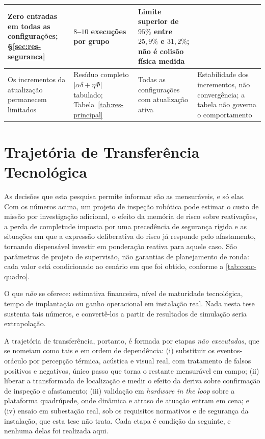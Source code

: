 \begin{table}[htb]
\begin{tabular}{p{}p{}p{}p{}}
Zero entradas em todas as configurações; §\ref{sec:res-seguranca} &
$8$--$10$ execuções por grupo &
Limite superior de $95\%$ entre $25{,}9\%$ e $31{,}2\%$; não é colisão física medida\\
\hline
Os incrementos da atualização permanecem limitados &
Resíduo completo $|\alpha\delta+\eta\Phi|$ tabulado;
Tabela~\ref{tab:res-principal} &
Todas as configurações com atualização ativa &
Estabilidade dos incrementos, não convergência; a tabela não governa o comportamento\\
\hline
\end{tabular}
\end{table}

\section{Trajetória de Transferência Tecnológica}
\label{sec:conc-transferencia}

As decisões que esta pesquisa permite informar são as mensuráveis, e só elas. Com os
números acima, um projeto de inspeção robótica pode estimar o custo de missão por
investigação adicional, o efeito da memória de risco sobre reativações, a perda de
completude imposta por uma precedência de segurança rígida e as situações em que a
expressão deliberativa do risco já responde pelo afastamento, tornando dispensável
investir em ponderação reativa para aquele caso. São parâmetros de projeto de
supervisão, não garantias de planejamento de ronda: cada valor está condicionado ao
cenário em que foi obtido, conforme a \autoref{tab:conc-quadro}.

O que \emph{não} se oferece: estimativa financeira, nível de maturidade tecnológica,
tempo de implantação ou ganho operacional em instalação real. Nada nesta tese sustenta
tais números, e convertê-los a partir de resultados de simulação seria extrapolação.

A trajetória de transferência, portanto, é formada por etapas \emph{não executadas},
que se nomeiam como tais e em ordem de dependência: (i) substituir os eventos-oráculo
por percepção térmica, acústica e visual real, com tratamento de falsos positivos e
negativos, único passo que torna o restante mensurável em campo; (ii) liberar a
transformada de localização e medir o efeito da deriva sobre confirmação de inspeção e
afastamento; (iii) validação em \textit{hardware in the loop} sobre a plataforma
quadrúpede, onde dinâmica e atraso de atuação entram em cena; e (iv) ensaio em
subestação real, sob os requisitos normativos e de segurança da instalação, que esta
tese não trata. Cada etapa é condição da seguinte, e nenhuma delas foi realizada aqui.

